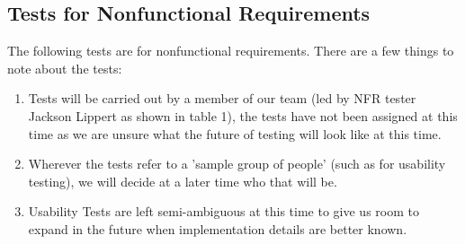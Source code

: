 \documentclass[12pt, titlepage]{article}
\begin{document}
\subsection{Tests for Nonfunctional Requirements}

The following tests are for nonfunctional requirements. There are a few things to note about the tests:
\begin{enumerate}
  \item Tests will be carried out by a member of our team (led by NFR tester Jackson Lippert as shown in table 1), the tests have not been assigned at this time as we are unsure what the future of testing will look like at this time.
  \item Wherever the tests refer to a 'sample group of people' (such as for usability testing), we will decide at a later time who that will be.
  \item Usability Tests are left semi-ambiguous at this time to give us room to expand in the future when implementation details are better known.
\end{enumerate}
\end{document}
